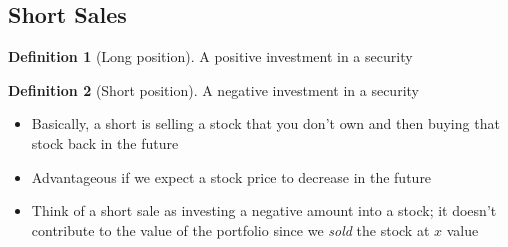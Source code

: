 \documentclass[11pt]{article}
\theoremstyle{definition}
\newtheorem*{definition}{Definition}
\begin{document}
\subsection{Short Sales}
\begin{definition}[Long position]
    A positive investment in a security
\end{definition}
\begin{definition}[Short position]
    A negative investment in a security
    \begin{itemize}
        \item Basically, a short is selling a stock that you don't own and then buying that stock back in the future
        \item Advantageous if we expect a stock price to decrease in the future
        \item Think of a short sale as investing a negative amount into a stock; it doesn't contribute to the value of the portfolio since we \textit{sold} the stock at $x$ value
    \end{itemize}
\end{definition}
\end{document}
